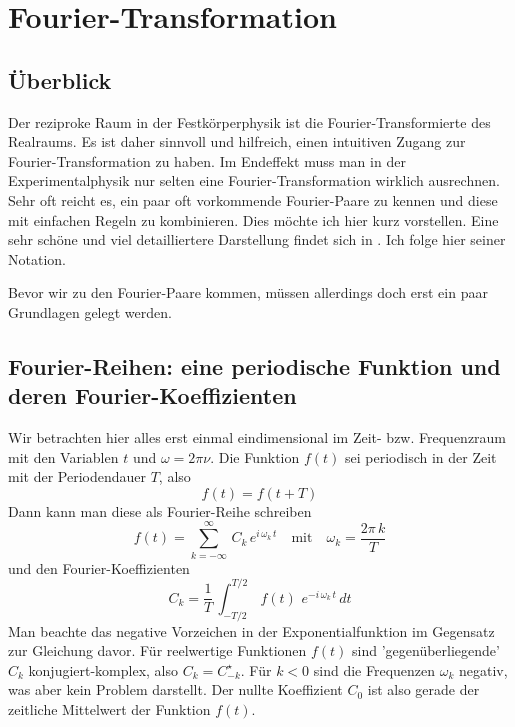 \renewcommand{\lastmod}{26. Februar 2021}
\renewcommand{\chapterauthors}{Markus Lippitz}

\chapter{Fourier-Transformation}



\section{Überblick}

Der reziproke Raum in der Festkörperphysik ist die Fourier-Transformierte des Realraums. Es ist daher sinnvoll und hilfreich, einen intuitiven Zugang zur Fourier-Transformation zu haben. Im Endeffekt muss man in der Experimentalphysik nur selten eine Fourier-Transformation wirklich ausrechnen. Sehr oft reicht es, ein paar oft vorkommende Fourier-Paare zu kennen und diese mit einfachen Regeln zu kombinieren. Dies möchte ich hier kurz vorstellen. Eine sehr schöne und viel detailliertere Darstellung findet sich in \cite{Butz2011}. Ich folge hier seiner Notation.

Bevor wir zu den Fourier-Paare kommen, müssen allerdings doch erst ein paar Grundlagen gelegt werden.

\section{Fourier-Reihen: eine periodische Funktion und deren Fourier-Koeffizienten}

Wir betrachten hier alles erst einmal eindimensional im Zeit- bzw. Frequenzraum mit den Variablen $t$ und $\omega = 2 \pi \nu$. Die Funktion $f(t)$ sei periodisch in der Zeit mit der Periodendauer $T$, also 
\begin{equation}
 f(t) = f (t + T)
\end{equation}
Dann kann man diese als Fourier-Reihe schreiben
\begin{equation}
 f(t) = \sum_{k=-\infty}^{\infty} \, C_k \, e^{i \, \omega_k \, t}
 \quad \text{mit} \quad \omega_k = \frac{2 \pi \, k}{T}
\end{equation}
und den Fourier-Koeffizienten
\begin{equation}
 C_k = \frac{1}{T} \, \int_{-T/2}^{T/2} \, f(t) \, \, e^{-i \, \omega_k \, t} \, dt
\end{equation}
Man beachte das negative Vorzeichen in der Exponentialfunktion im Gegensatz zur Gleichung davor. Für reelwertige Funktionen $f(t)$ sind 'gegenüberliegende' $C_k$ konjugiert-komplex, also  $C_k = C_{-k}^\star$. Für $k<0$ sind die Frequenzen $\omega_k$ negativ, was aber kein Problem darstellt. Der nullte Koeffizient $C_0$ ist also gerade der zeitliche Mittelwert der Funktion $f(t)$.



